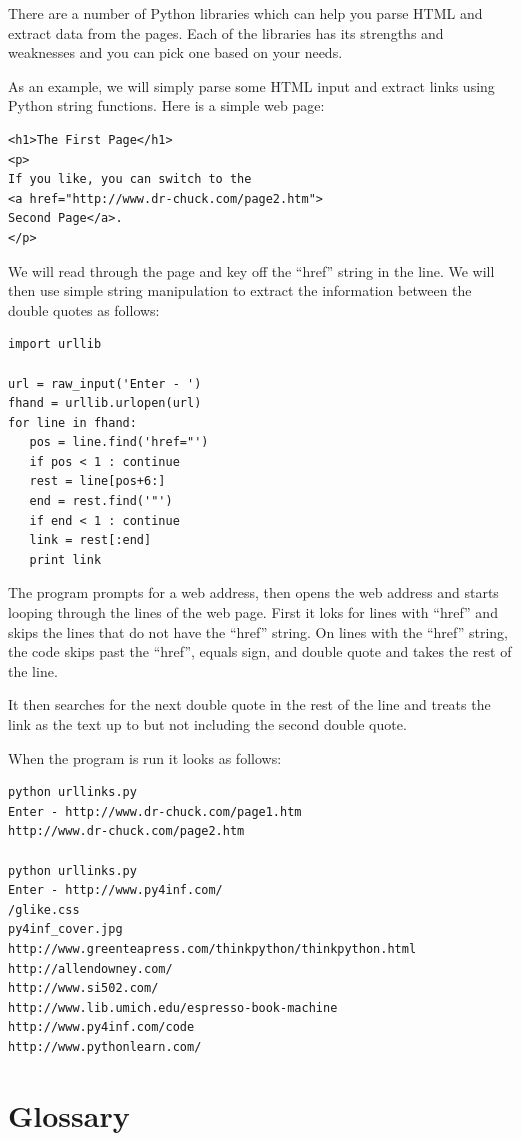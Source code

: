 There are a number of Python libraries which can help you parse
HTML and extract data from the pages.  Each of the libraries
has its strengths and weaknesses and you can pick one based on 
your needs.

As an example, we will simply parse some HTML input 
and extract links using Python string functions.   Here is a 
simple web page:

\beforeverb
\begin{verbatim}
<h1>The First Page</h1>
<p>
If you like, you can switch to the
<a href="http://www.dr-chuck.com/page2.htm">
Second Page</a>.
</p>
\end{verbatim}
\afterverb
%
We will read through the page and key off the ``href'' string
in the line.   We will then use simple string manipulation
to  extract the information between the double quotes as follows:

\beforeverb
\begin{verbatim}
import urllib

url = raw_input('Enter - ')
fhand = urllib.urlopen(url)
for line in fhand:
   pos = line.find('href="')
   if pos < 1 : continue
   rest = line[pos+6:]
   end = rest.find('"')
   if end < 1 : continue
   link = rest[:end]
   print link
\end{verbatim}
\afterverb
%
The program prompts for a web address, then opens the web
address and starts looping through the lines of the web page.
First it loks for lines with ``href'' and skips the lines
that do not have the ``href'' string.  On lines with the 
``href'' string, the code skips past the ``href'', equals sign, 
and double quote and takes the rest of the line.

It then searches for the next double quote in the rest of the 
line and treats the link as the text up to but not 
including the second double quote.

When the program is run it looks as follows:

\beforeverb
\begin{verbatim}
python urllinks.py 
Enter - http://www.dr-chuck.com/page1.htm
http://www.dr-chuck.com/page2.htm

python urllinks.py 
Enter - http://www.py4inf.com/
/glike.css
py4inf_cover.jpg
http://www.greenteapress.com/thinkpython/thinkpython.html
http://allendowney.com/
http://www.si502.com/
http://www.lib.umich.edu/espresso-book-machine
http://www.py4inf.com/code
http://www.pythonlearn.com/
\end{verbatim}
\afterverb
%
\section{Glossary}

